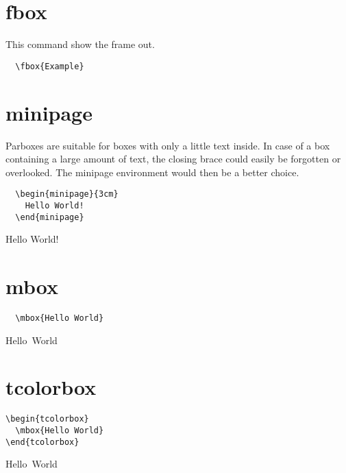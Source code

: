 \section{fbox}

This command show the frame out.

\begin{lstlisting}
  \fbox{Example}
\end{lstlisting}



\section{minipage}
\label{sec:minipage}

Parboxes are suitable for boxes with only a little text inside.
In case of a box containing a large amount of text, the closing brace could easily be forgotten or overlooked.
The minipage environment would then be a better choice.


\begin{lstlisting}
  \begin{minipage}{3cm}
    Hello World!
  \end{minipage}
\end{lstlisting}

\begin{minipage}{3cm}
  Hello World!
\end{minipage}

\section{mbox}
\label{sec:mbox}


\begin{lstlisting}
  \mbox{Hello World}
\end{lstlisting}

\mbox{Hello World}

\section{tcolorbox}
\label{sec:tcolorbox}

\begin{lstlisting}
\begin{tcolorbox}
  \mbox{Hello World}
\end{tcolorbox}
\end{lstlisting}

\begin{tcolorbox}
  \mbox{Hello World}
\end{tcolorbox}
